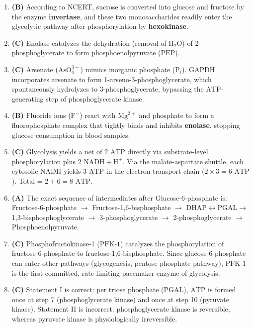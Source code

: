 \documentclass[11pt, a4paper]{article}
\begin{document}
\begin{enumerate}[label=\textbf{\arabic*.}]
\item \textbf{(B)} According to NCERT, sucrose is converted into glucose and fructose by the enzyme \textbf{invertase}, and these two monosaccharides readily enter the glycolytic pathway after phosphorylation by \textbf{hexokinase}.

\item \textbf{(C)} Enolase catalyzes the dehydration (removal of $\text{H}_2\text{O}$) of 2-phosphoglycerate to form phosphoenolpyruvate ($\text{PEP}$).

\item \textbf{(C)} Arsenate ($\text{AsO}_4^{3-}$) mimics inorganic phosphate ($\text{P}_i$). $\text{GAPDH}$ incorporates arsenate to form 1-arseno-3-phosphoglycerate, which spontaneously hydrolyzes to 3-phosphoglycerate, bypassing the $\text{ATP}$-generating step of phosphoglycerate kinase.

\item \textbf{(B)} Fluoride ions ($\text{F}^-$) react with $\text{Mg}^{2+}$ and phosphate to form a fluorophosphate complex that tightly binds and inhibits \textbf{enolase}, stopping glucose consumption in blood samples.

\item \textbf{(C)} Glycolysis yields a net of $2\text{ ATP}$ directly via substrate-level phosphorylation plus $2\text{ NADH} + \text{H}^+$. Via the malate-aspartate shuttle, each cytosolic $\text{NADH}$ yields $3\text{ ATP}$ in the electron transport chain ($2 \times 3 = 6\text{ ATP}$). Total = $2 + 6 = 8\text{ ATP}$.

\item \textbf{(A)} The exact sequence of intermediates after Glucose-6-phosphate is: Fructose-6-phosphate $\rightarrow$ Fructose-1,6-bisphosphate $\rightarrow$ $\text{DHAP} \leftrightarrow \text{PGAL} \rightarrow$ 1,3-bisphosphoglycerate $\rightarrow$ 3-phosphoglycerate $\rightarrow$ 2-phosphoglycerate $\rightarrow$ Phosphoenolpyruvate.

\item \textbf{(C)} Phosphofructokinase-1 ($\text{PFK-1}$) catalyzes the phosphorylation of fructose-6-phosphate to fructose-1,6-bisphosphate. Since glucose-6-phosphate can enter other pathways (glycogenesis, pentose phosphate pathway), $\text{PFK-1}$ is the first committed, rate-limiting pacemaker enzyme of glycolysis.

\item \textbf{(C)} Statement I is correct: per triose phosphate ($\text{PGAL}$), $\text{ATP}$ is formed once at step 7 (phosphoglycerate kinase) and once at step 10 (pyruvate kinase). Statement II is incorrect: phosphoglycerate kinase is reversible, whereas pyruvate kinase is physiologically irreversible.


\end{enumerate}
\end{document}
